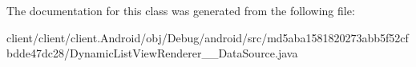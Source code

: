 The documentation for this class was generated from the following file\+:\begin{DoxyCompactItemize}
\item 
client/client/client.\+Android/obj/\+Debug/android/src/md5aba1581820273abb5f52cfbdde47dc28/Dynamic\+List\+View\+Renderer\+\_\+\_\+\+Data\+Source.\+java\end{DoxyCompactItemize}
